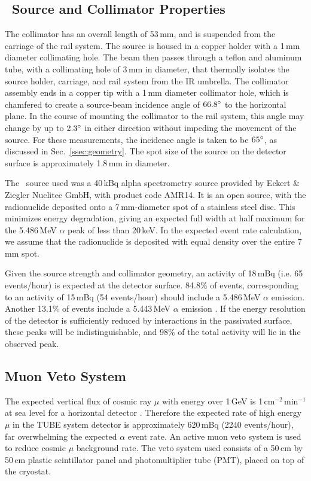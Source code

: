 \subsection{\am\ Source and Collimator Properties}

The collimator has an overall length of 53\,mm, and is suspended from the carriage of the rail system. The source is housed in a copper holder with a 1\,mm diameter collimating hole. The beam then passes through a teflon and aluminum tube, with a collimating hole of 3\,mm in diameter, that thermally isolates the source holder, carriage, and rail system from the IR umbrella. The collimator assembly ends in a copper tip with a 1\,mm diameter collimator hole, which is chamfered to create a source-beam incidence angle of $66.8\degree$ to the horizontal plane. In the course of mounting the collimator to the rail system, this angle may change by up to $2.3\degree$ in either direction without impeding the movement of the source. For these measurements, the incidence angle is taken to be $65\degree$, as discussed in Sec.~\ref{ssec:geometry}. The spot size of the source on the detector surface is approximately 1.8\,mm in diameter. 

The \am\ source used was a 40\,kBq alpha spectrometry source provided by Eckert \& Ziegler Nuclitec GmbH, with product code AMR14. It is an open source, with the radionuclide deposited onto a 7\,mm-diameter spot of a stainless steel disc. This minimizes energy degradation, giving an expected full width at half maximum for the 5.486\,MeV $\alpha$ peak of less than 20\,keV. In the expected event rate calculation, we assume that the radionuclide is deposited with equal density over the entire 7\,mm spot.

Given the source strength and collimator geometry, an activity of 18\,mBq (i.e. 65 events/hour) is expected at the detector surface. 84.8\% of events, corresponding to an activity of 15\,mBq (54 events/hour) should include a 5.486\,MeV $\alpha$ emission. Another 13.1\% of events include a 5.443\,MeV $\alpha$ emission \cite{nudat_Am}. If the energy resolution of the detector is sufficiently reduced by interactions in the passivated surface, these peaks will be indistinguishable, and 98\% of the total activity will lie in the observed peak. 

\subsection{Muon Veto System}
The expected vertical flux of cosmic ray $\mu$ with energy over 1\,GeV is 1\,cm$^{-2}$\,min$^{-1}$ at sea level for a horizontal detector \cite{PDG2014}. Therefore the expected rate of high energy $\mu$ in the TUBE system detector is approximately 620\,mBq (2240 events/hour), far overwhelming the expected $\alpha$ event rate. An active muon veto system is used to reduce cosmic $\mu$ background rate. The veto system used consists of a 50\,cm by 50\,cm plastic scintillator panel and photomultiplier tube (PMT), placed on top of the cryostat. 

